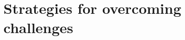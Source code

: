 \documentclass[a4]{scrartcl}
\begin{document}
\section{Strategies for overcoming challenges} \label{sec:Sec3}












	
\newpage
{}
\begin{spacing}{0.9}
	\printbibliography
\end{spacing}


	
	
	
	
	
	
\end{document}
